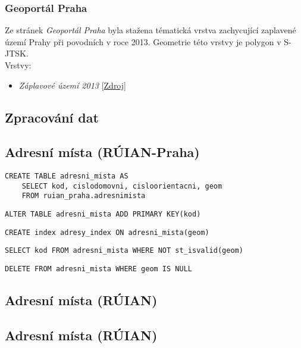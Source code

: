 \documentclass[a4paper, 12pt]{article}
\begin{document}
\subsubsection{Geoportál Praha}
Ze stránek \textit{Geoportál Praha} byla stažena tématická vrstva zachycující zaplavené území Prahy při povodních v roce 2013. Geometrie této vrstvy je polygon v S-JTSK. \\

Vrstvy:
\begin{itemize}
\item \textsl{Záplavové území 2013} [\href{http://www.geoportalpraha.cz/cs/opendata/C121457E-5450-42D0-9009-204D8D899A06#.XE9PwWlCfIV}{Zdroj}]
\end{itemize}

\subsection{Zpracování dat}


\subsection{Adresní místa (RÚIAN-Praha)}

\begin{lstlisting}
CREATE TABLE adresni_mista AS
	SELECT kod, cislodomovni, cisloorientacni, geom
	FROM ruian_praha.adresnimista
\end{lstlisting}

\begin{lstlisting}
ALTER TABLE adresni_mista ADD PRIMARY KEY(kod)
\end{lstlisting}

\begin{lstlisting}
CREATE index adresy_index ON adresni_mista(geom)
\end{lstlisting}

\begin{lstlisting}
SELECT kod FROM adresni_mista WHERE NOT st_isvalid(geom)
\end{lstlisting}

\begin{lstlisting}
DELETE FROM adresni_mista WHERE geom IS NULL
\end{lstlisting}

\subsection{Adresní místa (RÚIAN)}

\subsection{Adresní místa (RÚIAN)}
\end{document}
